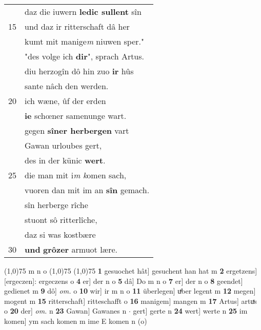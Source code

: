 \documentclass[8pt,a4paper,notitlepage]{article}
\begin{document}
\begin{table}[ht]
\begin{minipage}[t]{0.5\linewidth}
\begin{tabular}{rl}
 & daz die iuwern \textbf{ledic sullent} sîn\\ 
15 & und daz ir ritterschaft dâ her\\ 
 & kumt mit manige\textit{m} niuwen sper."\\ 
 & "des volge ich \textbf{dir}", sprach Artus.\\ 
 & diu herzogîn dô hin zuo \textbf{ir} hûs\\ 
 & sante nâch den werden.\\ 
20 & ich wæne, ûf der erden\\ 
 & \textbf{ie} schœner samenunge wart.\\ 
 & gegen \textbf{sîner herbergen} vart\\ 
 & Gawan urloubes gert,\\ 
 & des in der künic \textbf{wert}.\\ 
25 & die man mit i\textit{m k}omen sach,\\ 
 & vuoren dan mit im an \textbf{sîn} gemach.\\ 
 & sîn herberge rîche\\ 
 & stuont sô ritterlîche,\\ 
 & daz si was kostbære\\ 
30 & \textbf{und} \textbf{grôzer} armuot lære.\\ 
\end{tabular}
\scriptsize
\line(1,0){75} \newline
m n o \newline
\line(1,0){75} \newline
\newline
\line(1,0){75} \newline
\textbf{1} gesuochet hât] gesuchent han hat m \textbf{2} ergetzens] [ergeczen]: ergeczens o \textbf{4} er] der n o \textbf{5} dâ] Do m n o \textbf{7} er] der n o \textbf{8} geendet] gedienet m \textbf{9} dô] \textit{om.} o \textbf{10} wir] ir m n o \textbf{11} überlegen] uͯber legent m \textbf{12} megen] mogent m \textbf{15} ritterschaft] ritteschafft o \textbf{16} manigem] mangen m \textbf{17} Artus] artuͯs o \textbf{20} der] \textit{om.} n \textbf{23} Gawan] Gawanes n  $\cdot$ gert] gerte n \textbf{24} wert] werte n \textbf{25} im komen] ym sach komen m ime E komen n (o) \newline
\end{minipage}
\end{table}
\newpage
\end{document}
